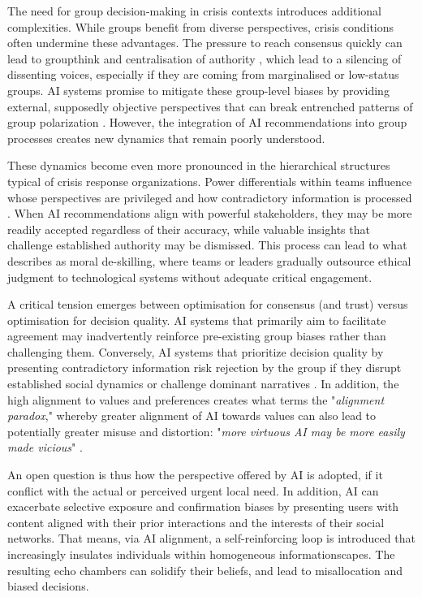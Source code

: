 \documentclass[pdflatex,sn-apa]{sn-jnl}%
\begin{document}
The need for group decision-making in crisis contexts introduces additional complexities. While groups benefit from diverse perspectives, crisis conditions often undermine these advantages. The pressure to reach consensus quickly can lead to groupthink and centralisation of authority \citep{driskell1991group}, which lead to a silencing of dissenting voices, especially if they are coming from marginalised or low-status groups. AI systems promise to mitigate these group-level biases by providing external, supposedly objective perspectives that can break entrenched patterns of group polarization \citep{jirovsky2021can}. However, the integration of AI recommendations into group processes creates new dynamics that remain poorly understood.


These dynamics become even more pronounced in the hierarchical structures typical of crisis response organizations. Power differentials within teams influence whose perspectives are privileged and how contradictory information is processed \citep{comes2024ai}. When AI recommendations align with powerful stakeholders, they may be more readily accepted regardless of their accuracy, while valuable insights that challenge established authority may be dismissed. This process can lead to what \citet{vallor2015moral} describes as moral de-skilling, where teams or leaders gradually outsource ethical judgment to technological systems without adequate critical engagement.

A critical tension emerges between optimisation for consensus (and trust) versus optimisation for decision quality. AI systems that primarily aim to facilitate agreement may inadvertently reinforce pre-existing group biases rather than challenging them. Conversely, AI systems that prioritize decision quality by presenting contradictory information risk rejection by the group if they disrupt established social dynamics or challenge dominant narratives \citep{manzini2024should}. In addition, the high alignment to values and preferences creates what \citet{west2025ai} terms the "\textit{alignment paradox}," whereby greater alignment of AI towards values can also lead to potentially greater misuse and distortion: "\textit{more virtuous AI may be more easily made vicious}" \citep{west2025ai}.

An open question is thus how the perspective offered by AI is adopted, if it conflict with the actual or perceived urgent local need. In addition, AI can exacerbate selective exposure and confirmation biases by presenting users with content aligned with their prior interactions and the interests of their social networks. That means, via AI alignment, a self-reinforcing loop is introduced that increasingly insulates individuals within homogeneous informationscapes. The resulting echo chambers can solidify their beliefs, and lead to misallocation and biased decisions. 
\end{document}
